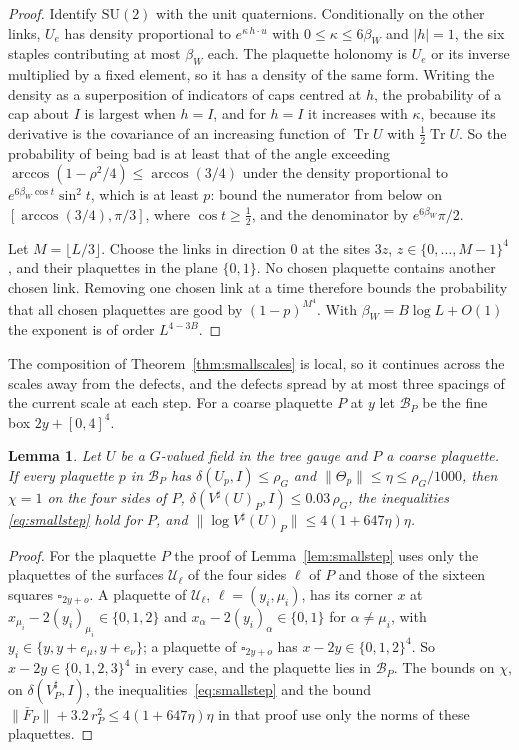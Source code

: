\documentclass[11pt]{amsart}
\newtheorem{lemma}[theorem]{Lemma}
\theoremstyle{definition}
\theoremstyle{remark}
\numberwithin{equation}{section}
\newcommand{\SU}{\mathrm{SU}}
\newcommand{\Tr}{\operatorname{Tr}}
\begin{document}
\begin{proof}
Identify $\SU(2)$ with the unit quaternions. Conditionally on the other
links, $U_e$ has density proportional to $e^{\kappa\,h\cdot u}$ with
$0\le\kappa\le6\beta_W$ and $|h|=1$, the six staples contributing at most
$\beta_W$ each. The plaquette holonomy is $U_e$ or its inverse multiplied
by a fixed element, so it has a density of the same form. Writing the
density as a superposition of indicators of caps centred at $h$, the
probability of a cap about $I$ is largest when $h=I$, and for $h=I$ it
increases with $\kappa$, because its derivative is the covariance of an
increasing function of $\Tr U$ with $\frac12\Tr U$. So the probability of
being bad is at least that of the angle exceeding $\arccos(1-\rho^2/4)\le
\arccos(3/4)$ under the density proportional to $e^{6\beta_W\cos t}\sin^2t$,
which is at least $p$: bound the numerator from below on $[\arccos(3/4),
\pi/3]$, where $\cos t\ge\frac12$, and the denominator by $e^{6\beta_W}
\pi/2$.

Let $M=\lfloor L/3\rfloor$. Choose the links in direction $0$ at the sites
$3z$, $z\in\{0,\dots,M-1\}^4$, and their plaquettes in the plane $\{0,1
\}$. No chosen plaquette contains another chosen link. Removing one chosen
link at a time therefore bounds the probability that all chosen plaquettes
are good by $(1-p)^{M^4}$. With $\beta_W=B\log L+O(1)$ the exponent is of order
$L^{4-3B}$.
\end{proof}

The composition of Theorem~\ref{thm:smallscales} is local, so it continues
across the scales away from the defects, and the defects spread by at most
three spacings of the current scale at each step. For a coarse plaquette $P$
at $y$ let $\mathcal B_P$ be the fine box $2y+[0,4]^4$.

\begin{lemma}\label{lem:localstep}
Let $U$ be a $G$-valued field in the tree gauge and $P$ a coarse plaquette.
If every plaquette $p$ in $\mathcal B_P$ has $\delta(U_p,I)\le\rho_G$ and
$\lVert\Theta_p\rVert\le\eta\le\rho_G/1000$, then $\chi=1$ on the four sides
of $P$, $\delta(V^\sharp(U)_P,I)\le0.03\,\rho_G$, the inequalities
\eqref{eq:smallstep} hold for $P$, and $\lVert\log V^\sharp(U)_P\rVert\le
4(1+647\eta)\eta$.
\end{lemma}

\begin{proof}
For the plaquette $P$ the proof of Lemma~\ref{lem:smallstep} uses only the
plaquettes of the surfaces $\mathcal U_\ell$ of the four sides $\ell$ of $P$
and those of the sixteen squares $\square_{2y+o}$. A plaquette of $\mathcal
U_\ell$, $\ell=(y_i,\mu_i)$, has its corner $x$ at $x_{\mu_i}-2(y_i)_{\mu_i}
\in\{0,1,2\}$ and $x_\alpha-2(y_i)_\alpha\in\{0,1\}$ for $\alpha\ne\mu_i$,
with $y_i\in\{y,y+e_\mu,y+e_\nu\}$; a plaquette of $\square_{2y+o}$ has
$x-2y\in\{0,1,2\}^4$. So $x-2y\in\{0,1,2,3\}^4$ in every case, and the
plaquette lies in $\mathcal B_P$. The bounds on $\chi$, on $\delta(V^\sharp_P,
I)$, the inequalities~\eqref{eq:smallstep} and the bound $\lVert\bar F_P
\rVert+3.2\,r_P^2\le4(1+647\eta)\eta$ in that proof use only the norms of
these plaquettes.
\end{proof}
\end{document}
